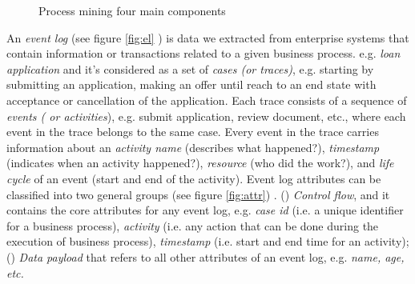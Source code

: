 
\begin{figure}[htb]
	\begin{center}
		\caption{Process mining four main components \cite{dumas2013fundamentals}}
		\label{fig:pm1}
	\end{center}
\end{figure}


An \textit{event log}  (see figure \ref{fig:el} ) is data we extracted from enterprise systems that contain information or transactions related to a given business process. e.g. \textit{loan application} and it’s considered as a set of \textit{cases (or traces)}, e.g. starting by submitting an application, making an offer until reach to an end state with acceptance or cancellation of the application. Each trace consists of a sequence of \textit{events ( or activities}), e.g. submit application, review document, etc., where each event in the trace belongs to the same case. Every event in the trace carries information about an \textit{activity name} (describes what happened?), \textit{timestamp} (indicates when an activity happened?), \textit{resource} (who did the work?), and \textit{life cycle} of an event (start and end of the activity). Event log attributes can be classified into two general groups (see figure \ref{fig:attr}) \cite{teinemaa2019outcome}. () \textit{Control flow}, and it contains the core attributes for any event log, e.g. \textit{case id} (i.e. a unique identifier for a business process), \textit{activity} (i.e. any action that can be done during the execution of business process), \textit{timestamp} (i.e. start and end time for an activity); () \textit{Data payload} that refers to all other attributes of an event log, e.g. \textit{name, age, etc.} 

